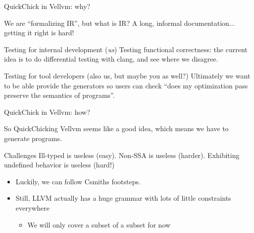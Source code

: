 \documentclass{beamer}
\begin{document}
\begin{frame}{QuickChick in Vellvm: why?}
  
  We are ``formalizing IR'', but what is IR? A long, informal documentation... getting it right is hard!

  \begin{block}{Testing for internal development (\emph{us})}
    Testing functional correctness: the current idea is to do differential testing with clang, and see
    where we disagree.
  \end{block}

  \begin{block}{Testing for tool developers (also us, but maybe you as well?)}
    Ultimately we want to be able provide the generators so users
    can check ``does my optimization pass preserve the semantics of programs''.
  \end{block}

\end{frame}

\begin{frame}{QuickChick in Vellvm: how?}
  
  So QuickChicking Vellvm seems like a good idea, which means we have
  to generate programs.

  \begin{alertblock}{Challenges}
    Ill-typed is useless (easy). Non-SSA is useless (harder). Exhibiting undefined behavior is useless (hard!)
  \end{alertblock}

  \begin{itemize}
  \item Luckily, we can follow Csmiths footsteps.
  \item Still, LLVM actually has a huge grammar with lots of little
    constraints everywhere
    \begin{itemize}
    \item We will only cover a subset of a subset for now
    \end{itemize}
  \end{itemize}
\end{frame}
\end{document}
